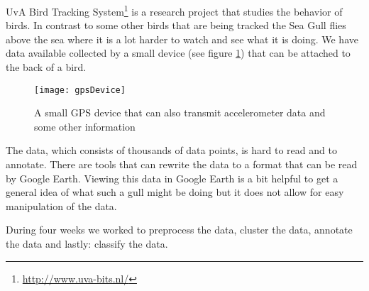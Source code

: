 UvA Bird Tracking System\footnote{\url{http://www.uva-bits.nl/} } is a research 
project that studies the behavior of
birds. 
In contrast to some other birds that are being tracked the Sea Gull flies above the 
sea where it is a lot harder to watch and see what it is doing. We have data available
collected by a small device (see figure \ref{fig:gpsDevice}) that can be attached to 
the back of a bird. 

\begin{figure}[h]
    \center
    \texttt{[image: gpsDevice]}
    \caption{A small GPS device that can also transmit accelerometer data and some other
information}
    \label{fig:gpsDevice}
\end{figure}

The data, which consists of thousands of data points, is hard to read and to annotate. 
There are tools that can rewrite the data to a format that can be read by Google Earth. 
Viewing this data in Google Earth is a bit helpful to get a general idea of what such 
a gull might be doing but it does not allow for easy manipulation of the data. 

During four weeks we worked to preprocess the data, cluster the data, annotate the 
data and lastly: classify the data. 



